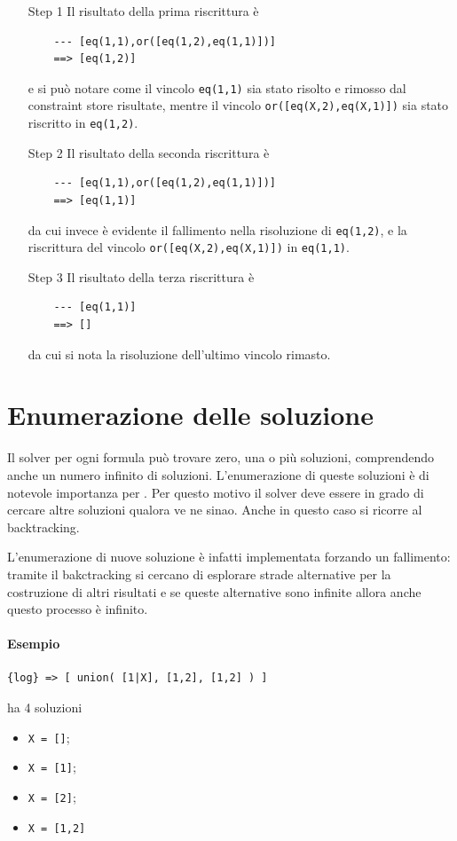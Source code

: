 \documentclass[12pt,a4paper,openright]{book} %
\begin{document}
\begin{itemize}

	\item[Step 1] Il risultato della prima riscrittura è
	\begin{verbatim}
	--- [eq(1,1),or([eq(1,2),eq(1,1)])]
	==> [eq(1,2)]
	\end{verbatim}
	e si può notare come il vincolo \verb|eq(1,1)| sia stato
        risolto e rimosso dal constraint store risultate, mentre il
        vincolo \verb|or([eq(X,2),eq(X,1)])| sia stato riscritto in
        \verb|eq(1,2)|.

	\item[Step 2] Il risultato della seconda riscrittura è
	\begin{verbatim}
	--- [eq(1,1),or([eq(1,2),eq(1,1)])]
	==> [eq(1,1)]
	\end{verbatim}
	da cui invece è evidente il fallimento nella risoluzione di
        \verb|eq(1,2)|, e la riscrittura del vincolo
        \verb|or([eq(X,2),eq(X,1)])| in \verb|eq(1,1)|.

	\item[Step 3] Il risultato della terza riscrittura è
	\begin{verbatim}
	--- [eq(1,1)]
	==> []
	\end{verbatim}
	da cui si nota la risoluzione dell'ultimo vincolo rimasto.

\end{itemize}

\section{Enumerazione delle soluzione}
\label{sec:lsetpicat_solutions}

Il solver per ogni formula può trovare zero, una o più soluzioni,
comprendendo anche un numero infinito di soluzioni. L'enumerazione di
queste soluzioni è di notevole importanza per \lset{}. Per questo
motivo il solver deve essere in grado di cercare altre soluzioni
qualora ve ne sinao. Anche in questo caso si ricorre al backtracking.

L'enumerazione di nuove soluzione è infatti implementata forzando un
fallimento: tramite il bakctracking si cercano di esplorare strade
alternative per la costruzione di altri risultati e se queste
alternative sono infinite allora anche questo processo è infinito.

\paragraph{Esempio}
\begin{verbatim}
{log} => [ union( [1|X], [1,2], [1,2] ) ]
\end{verbatim}
ha 4 soluzioni
\begin{itemize}
	\item \verb|X = []|;
	\item \verb|X = [1]|;
	\item \verb|X = [2]|;
	\item \verb|X = [1,2]|
\end{itemize}
\end{document}
